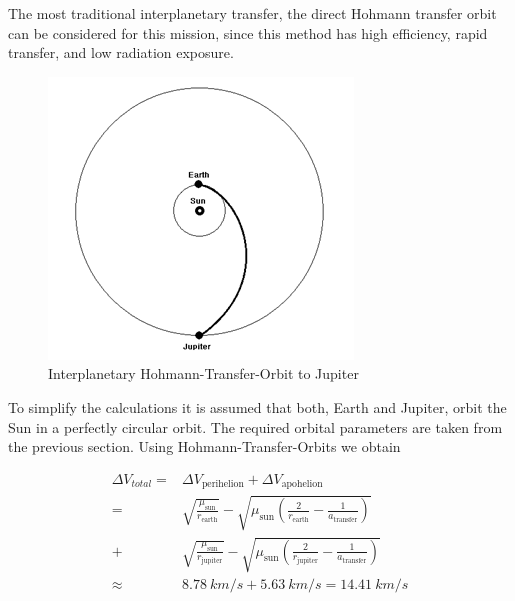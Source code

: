 

The most traditional interplanetary transfer, the direct Hohmann
transfer orbit can be considered for this mission, since this method
has high efficiency, rapid transfer, and low radiation
exposure.\cite{Wertz2011SpaceMissionEng}

\begin{figure}[H]
  \includegraphics[width=\textwidth]{Hohmann-Orbit}
  \caption{Interplanetary Hohmann-Transfer-Orbit to Jupiter}
\end{figure}

To simplify the calculations it is assumed that both, Earth and
Jupiter, orbit the Sun in a perfectly circular orbit.  The required
orbital parameters are taken from the previous section.  Using
Hohmann-Transfer-Orbits we obtain

\begin{align*}
  \Delta V_{total} = {} &
  \Delta V_{\mathrm{perihelion}}
  + \Delta V_{\mathrm{apohelion}} \\
  = {} & \sqrt{\frac{\mu_{\mathrm{sun}}}{r_{\mathrm{earth}}}}
  - \sqrt{\mu_{\mathrm{sun}} \left(\frac{2}{r_{\mathrm{earth}}}
    - \frac{1}{a_{\mathrm{transfer}}}\right)} \\
  + & \sqrt{\frac{\mu_{\mathrm{sun}}}{r_{\mathrm{jupiter}}}}
  - \sqrt{\mu_{\mathrm{sun}}\left(\frac{2}{r_{\mathrm{jupiter}}}
    - \frac{1}{a_{\mathrm{transfer}}}\right)} \\
  \approx {} & \SI{8.78}{km/s} + \SI{5.63}{km/s} = \SI{14.41}{km/s} \\
\end{align*}

